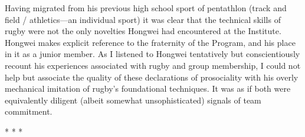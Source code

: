 Having migrated from his previous high school sport of pentathlon (track and field / athletics---an individual sport) it was clear that the technical skills of rugby were not the only novelties Hongwei had encountered at the Institute.  Hongwei makes explicit reference to the fraternity of the Program, and his place in it as a junior member.  As I listened to Hongwei tentatively but conscientiously recount his experiences associated with rugby and group membership, I could not help but associate the quality of these declarations of prosociality with his overly mechanical imitation of rugby's foundational techniques.  It was as if both were equivalently diligent (albeit somewhat unsophisticated) signals of team commitment.

\begin{center}
  * * *
\end{center}


